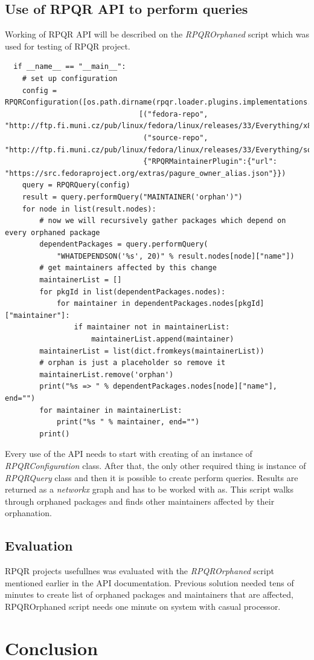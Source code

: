 \section{Use of RPQR API to perform queries}

Working of RPQR API will be described on the \textit{RPQROrphaned} script which was used for testing
of RPQR project.

\begin{lstlisting}
  if __name__ == "__main__":
    # set up configuration
    config = RPQRConfiguration([os.path.dirname(rpqr.loader.plugins.implementations.__file__)],
                               [("fedora-repo", "http://ftp.fi.muni.cz/pub/linux/fedora/linux/releases/33/Everything/x86_64/os/"),
                                ("source-repo", "http://ftp.fi.muni.cz/pub/linux/fedora/linux/releases/33/Everything/source/tree/")],
                                {"RPQRMaintainerPlugin":{"url": "https://src.fedoraproject.org/extras/pagure_owner_alias.json"}})
    query = RPQRQuery(config)
    result = query.performQuery("MAINTAINER('orphan')")
    for node in list(result.nodes):
        # now we will recursively gather packages which depend on every orphaned package
        dependentPackages = query.performQuery(
            "WHATDEPENDSON('%s', 20)" % result.nodes[node]["name"])
        # get maintainers affected by this change
        maintainerList = []
        for pkgId in list(dependentPackages.nodes):
            for maintainer in dependentPackages.nodes[pkgId]["maintainer"]:
                if maintainer not in maintainerList:
                    maintainerList.append(maintainer)
        maintainerList = list(dict.fromkeys(maintainerList))
        # orphan is just a placeholder so remove it
        maintainerList.remove('orphan')
        print("%s => " % dependentPackages.nodes[node]["name"], end="")
        for maintainer in maintainerList:
            print("%s " % maintainer, end="")
        print()
\end{lstlisting}

Every use of the API needs to start with creating of an instance of \textit{RPQRConfiguration} class.
After that, the only other required thing is instance of \textit{RPQRQuery} class and then it is
possible to create perform queries. Results are returned as a \textit{networkx} graph and has to be
worked with as. This script walks through orphaned packages and finds other maintainers affected by
their orphanation. 

\section{Evaluation}

RPQR projects usefullnes was evaluated with the \textit{RPQROrphaned} script mentioned earlier in
the API documentation. Previous solution needed tens of minutes to create list of orphaned packages
and maintainers that are affected, RPQROrphaned script needs one minute on system with casual processor.

\chapter{Conclusion}

\blindtext